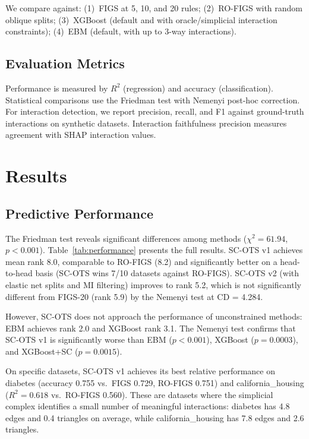 \documentclass[11pt,letterpaper]{article}
\begin{document}
We compare against: (1)~FIGS \citep{Tan2022} at 5, 10, and 20 rules; (2)~RO-FIGS \citep{Matjasec2025} with random oblique splits; (3)~XGBoost \citep{Chen2016} (default and with oracle/simplicial interaction constraints); (4)~EBM \citep{Nori2019} (default, with up to 3-way interactions).

\subsection{Evaluation Metrics}
\label{sec:metrics}

Performance is measured by $R^2$ (regression) and accuracy (classification). Statistical comparisons use the Friedman test with Nemenyi post-hoc correction. For interaction detection, we report precision, recall, and F1 against ground-truth interactions on synthetic datasets. Interaction faithfulness precision measures agreement with SHAP interaction values.

\section{Results}
\label{sec:results}

\subsection{Predictive Performance}
\label{sec:pred_perf}

The Friedman test reveals significant differences among methods ($\chi^2 = 61.94$, $p < 0.001$). Table~\ref{tab:performance} presents the full results. SC-OTS v1 achieves mean rank 8.0, comparable to RO-FIGS (8.2) and significantly better on a head-to-head basis (SC-OTS wins 7/10 datasets against RO-FIGS). SC-OTS v2 (with elastic net splits and MI filtering) improves to rank 5.2, which is not significantly different from FIGS-20 (rank 5.9) by the Nemenyi test at CD = 4.284.

However, SC-OTS does not approach the performance of unconstrained methods: EBM achieves rank 2.0 and XGBoost rank 3.1. The Nemenyi test confirms that SC-OTS v1 is significantly worse than EBM ($p < 0.001$), XGBoost ($p = 0.0003$), and XGBoost+SC ($p = 0.0015$).

On specific datasets, SC-OTS v1 achieves its best relative performance on diabetes (accuracy 0.755 vs.\ FIGS 0.729, RO-FIGS 0.751) and california\_housing ($R^2 = 0.618$ vs.\ RO-FIGS 0.560). These are datasets where the simplicial complex identifies a small number of meaningful interactions: diabetes has 4.8 edges and 0.4 triangles on average, while california\_housing has 7.8 edges and 2.6 triangles.
\end{document}
